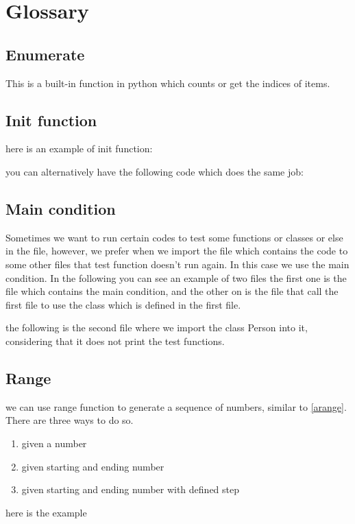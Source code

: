 \documentclass[10pt,a4paper]{article}
\begin{document}
\section{Glossary}


\subsection{Enumerate}
\label{enumerate}
This is a built-in function in python which counts or get the indices  of items.



\subsection{Init function}
\label{subsec:init}
here is an example of init function:

you can alternatively have the following code which does the same job:



\subsection{Main condition} \label{main}
Sometimes we want to run certain codes to test some functions or classes or else in the file, however, we prefer when we import the file which contains the code to some other files that test function doesn't run again. In this case we use the main condition. In the following you can see an example of two files the first one is the file which contains the main condition, and the other on is the file that call the first file to use the class which is defined in the first file.

the following is the second file where we import the class Person into it, considering that it does not print the test functions.



\subsection{Range} \label{range}
we can use range function to generate a sequence of numbers, similar to \ref{arange}. There are three ways to do so.
\begin{enumerate}
\item given a number
\item given starting and ending number
\item given starting and ending number with defined step
\end{enumerate}
here is the example

\end{document}
